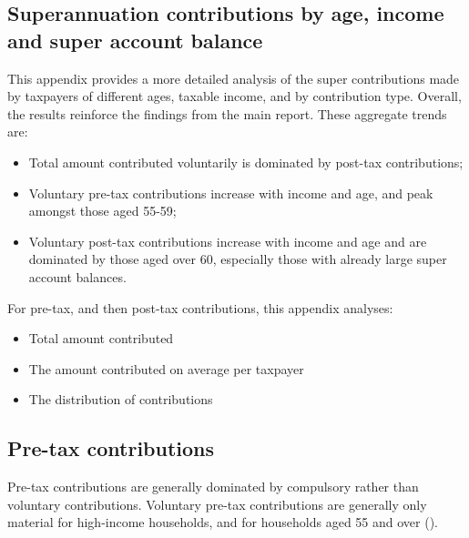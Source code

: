 \begin{subappendices}




\chapter{Superannuation contributions by age, income and super account balance}\label{appendix:SUPER-A}
This appendix provides a more detailed analysis of the super contributions made by taxpayers of different ages, taxable income, and by contribution type. Overall, the results reinforce the findings from the main report. These aggregate trends are:
\begin{itemize}
\item Total amount contributed voluntarily is dominated by post-tax contributions; 
\item Voluntary pre-tax contributions increase with income and age, and peak amongst those aged 55-59;
\item Voluntary post-tax contributions increase with income and age and are dominated by those aged over 60, especially those with already large super account balances.
\end{itemize}
For pre-tax, and then post-tax contributions, this appendix analyses:
\begin{itemize}
\item Total amount contributed
\item The amount contributed on average per taxpayer
\item The distribution of contributions
\end{itemize}
\section{Pre-tax contributions}
Pre-tax contributions are generally dominated by compulsory rather than voluntary contributions. Voluntary pre-tax contributions are generally only material for high-income households, and for households aged 55 and over ().



\end{subappendices}
